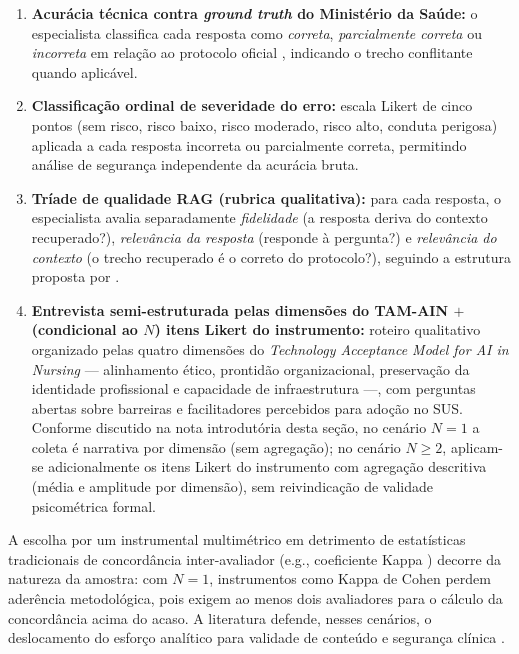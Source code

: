 \documentclass[
  12pt,
  oneside,
  a4paper,
  english,
  brazil
]{abntex2}
\begin{document}
\begin{enumerate}[label=\textbf{I\arabic*}]
  \item \textbf{Acurácia técnica contra \textit{ground truth} do Ministério da Saúde:}
        o especialista classifica cada resposta como \textit{correta},
        \textit{parcialmente correta} ou \textit{incorreta} em relação ao protocolo
        oficial \cite{brasil2022}, indicando o trecho conflitante quando aplicável.
  \item \textbf{Classificação ordinal de severidade do erro:} escala Likert de cinco
        pontos (sem risco, risco baixo, risco moderado, risco alto, conduta
        perigosa) aplicada a cada resposta incorreta ou parcialmente correta,
        permitindo análise de segurança independente da acurácia bruta.
  \item \textbf{Tríade de qualidade RAG (rubrica qualitativa):} para cada resposta, o
        especialista avalia separadamente \textit{fidelidade} (a resposta deriva do
        contexto recuperado?), \textit{relevância da resposta} (responde à pergunta?)
        e \textit{relevância do contexto} (o trecho recuperado é o correto do
        protocolo?), seguindo a estrutura proposta por \citeauthor{es2024}
        \cite{es2024}.
  \item \textbf{Entrevista semi-estruturada pelas dimensões do TAM-AIN
        $+$ (condicional ao $N$) itens Likert do instrumento:} roteiro
        qualitativo organizado pelas quatro dimensões do \textit{Technology
        Acceptance Model for AI in Nursing} \cite{nursingTAM2024} ---
        alinhamento ético, prontidão organizacional, preservação da
        identidade profissional e capacidade de infraestrutura ---, com
        perguntas abertas sobre barreiras e facilitadores percebidos para
        adoção no SUS. Conforme discutido na nota introdutória desta seção,
        no cenário $N=1$ a coleta é narrativa por dimensão (sem agregação);
        no cenário $N \geq 2$, aplicam-se adicionalmente os itens Likert do
        instrumento com agregação descritiva (média e amplitude por
        dimensão), sem reivindicação de validade psicométrica formal.
\end{enumerate}

A escolha por um instrumental multimétrico em detrimento de estatísticas tradicionais
de concordância inter-avaliador (e.g., coeficiente Kappa \cite{landis1977}) decorre
da natureza da amostra: com $N=1$, instrumentos como Kappa de Cohen perdem aderência
metodológica, pois exigem ao menos dois avaliadores para o cálculo da concordância
acima do acaso. A literatura defende, nesses cenários, o deslocamento do esforço
analítico para validade de conteúdo e segurança clínica \cite{ocaf2024}.
\end{document}

